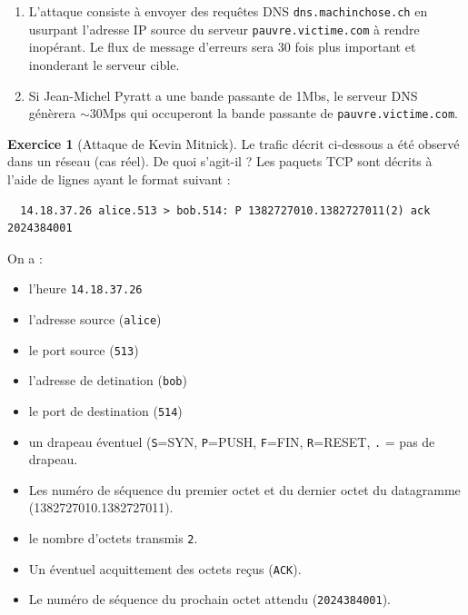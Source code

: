 \documentclass[a4paper,9pt]{article}
\theoremstyle{plain}
\theoremstyle{definition}
\newtheorem{exercice}{Exercice}
\begin{document}
\begin{correction}
\begin{enumerate}
\item L'attaque consiste à envoyer des requêtes DNS \verb|dns.machinchose.ch| en usurpant l'adresse IP source du serveur \verb|pauvre.victime.com| à rendre inopérant. Le flux de message d'erreurs sera 30 fois plus important et inonderant le serveur cible.  

\item Si Jean-Michel Pyratt a une bande passante de 1Mbs, le serveur DNS génèrera $\sim 30$Mps qui occuperont la bande passante de \verb|pauvre.victime.com|.
\end{enumerate}
\end{correction}




\begin{exercice}[Attaque de Kevin Mitnick]
  Le trafic décrit ci-dessous a été observé dans un réseau (cas réel). De quoi s'agit-il ? Les paquets TCP sont décrits à l'aide de lignes ayant le format suivant :
\begin{verbatim}
  14.18.37.26 alice.513 > bob.514: P 1382727010.1382727011(2) ack 2024384001
\end{verbatim}
On a :
\begin{itemize}
\item l'heure \verb|14.18.37.26|
\item l'adresse source (\verb|alice|)
\item le port source (\verb|513|)
\item  l'adresse de detination (\verb|bob|)
\item le port de destination (\verb|514|)
\item un drapeau éventuel (\verb|S|=SYN, \verb|P|=PUSH, \verb|F|=FIN, \verb|R|=RESET, \verb|.| = pas de drapeau.
\item Les numéro de séquence du premier octet et du dernier octet du datagramme (1382727010.1382727011).
\item le nombre d'octets transmis \verb|2|.
\item Un éventuel acquittement des octets reçus (\verb|ACK|).
  \item Le numéro de séquence du prochain octet attendu (\verb|2024384001|).
\end{itemize}



\end{exercice}
\end{document}
